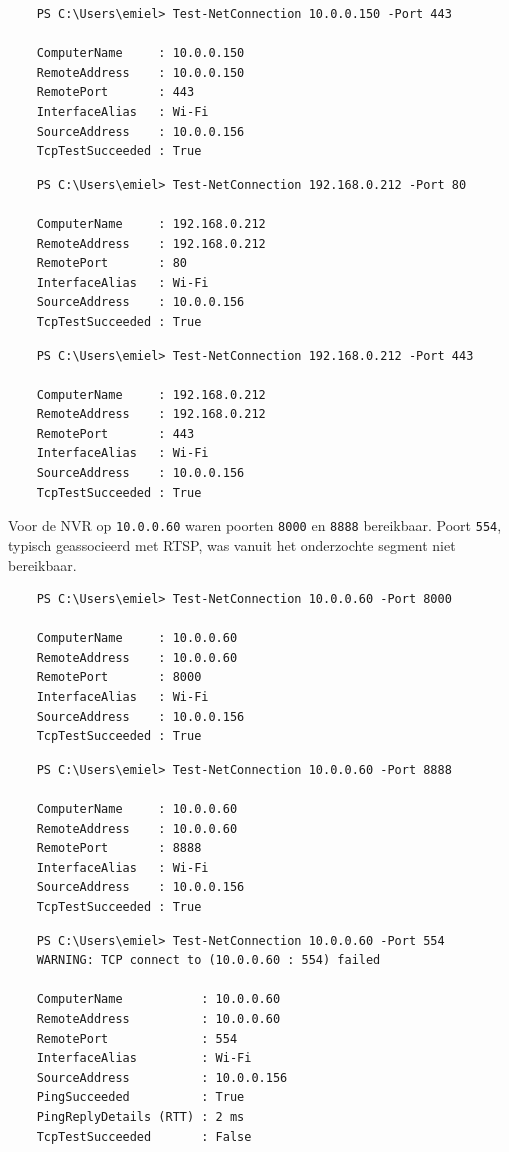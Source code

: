 \begin{verbatim}
    PS C:\Users\emiel> Test-NetConnection 10.0.0.150 -Port 443
    
    ComputerName     : 10.0.0.150
    RemoteAddress    : 10.0.0.150
    RemotePort       : 443
    InterfaceAlias   : Wi-Fi
    SourceAddress    : 10.0.0.156
    TcpTestSucceeded : True
\end{verbatim}

\begin{verbatim}
    PS C:\Users\emiel> Test-NetConnection 192.168.0.212 -Port 80
    
    ComputerName     : 192.168.0.212
    RemoteAddress    : 192.168.0.212
    RemotePort       : 80
    InterfaceAlias   : Wi-Fi
    SourceAddress    : 10.0.0.156
    TcpTestSucceeded : True
\end{verbatim}

\begin{verbatim}
    PS C:\Users\emiel> Test-NetConnection 192.168.0.212 -Port 443
    
    ComputerName     : 192.168.0.212
    RemoteAddress    : 192.168.0.212
    RemotePort       : 443
    InterfaceAlias   : Wi-Fi
    SourceAddress    : 10.0.0.156
    TcpTestSucceeded : True
\end{verbatim}

Voor de NVR op \texttt{10.0.0.60} waren poorten \texttt{8000} en \texttt{8888} bereikbaar. Poort \texttt{554}, typisch geassocieerd met RTSP, was vanuit het onderzochte segment niet bereikbaar.

\begin{verbatim}
    PS C:\Users\emiel> Test-NetConnection 10.0.0.60 -Port 8000
    
    ComputerName     : 10.0.0.60
    RemoteAddress    : 10.0.0.60
    RemotePort       : 8000
    InterfaceAlias   : Wi-Fi
    SourceAddress    : 10.0.0.156
    TcpTestSucceeded : True
\end{verbatim}

\begin{verbatim}
    PS C:\Users\emiel> Test-NetConnection 10.0.0.60 -Port 8888
    
    ComputerName     : 10.0.0.60
    RemoteAddress    : 10.0.0.60
    RemotePort       : 8888
    InterfaceAlias   : Wi-Fi
    SourceAddress    : 10.0.0.156
    TcpTestSucceeded : True
\end{verbatim}

\begin{verbatim}
    PS C:\Users\emiel> Test-NetConnection 10.0.0.60 -Port 554
    WARNING: TCP connect to (10.0.0.60 : 554) failed
    
    ComputerName           : 10.0.0.60
    RemoteAddress          : 10.0.0.60
    RemotePort             : 554
    InterfaceAlias         : Wi-Fi
    SourceAddress          : 10.0.0.156
    PingSucceeded          : True
    PingReplyDetails (RTT) : 2 ms
    TcpTestSucceeded       : False
\end{verbatim}

